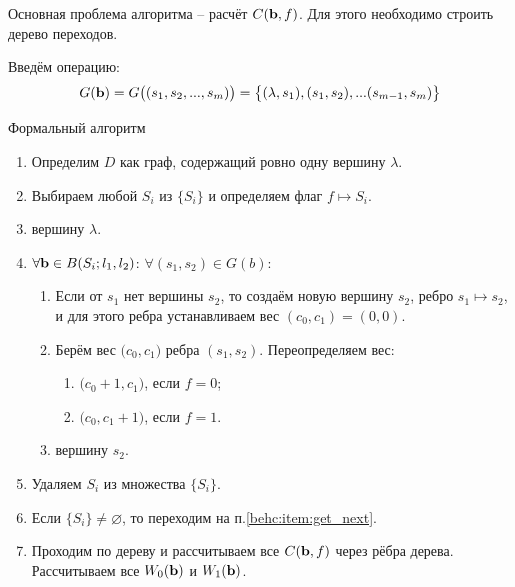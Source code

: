 \begin{frame}
	Основная проблема алгоритма -- расчёт $C(\bold b, f)$. Для этого необходимо строить дерево переходов. 
	
	Введём операцию:
	\begin{equation}
	G(\bold b) = G\big( (s_1, s_2, ..., s_m) \big)
	= \big\{ (\lambda, s_1), (s_1, s_2), ... (s_{m-1}, s_m) \big\}
	\end{equation}
\end{frame}

\begin{frame}{Формальный алгоритм}
	\small
	\begin{enumerate}
		\item Определим $D$ как граф, содержащий ровно одну вершину $\lambda$.
		\item Выбираем любой $S_i$ из $\big\{ S_i\big\}$ и определяем флаг $f \longmapsto S_i$.
			\label{behc:item:get_next}
		\item {} вершину $\lambda$.
		\item $\forall \bold b \in B(S_i; l_1, l_2)$:  
		$\forall (s_1, s_2) \in G(b)$: 
		\begin{enumerate}
			\item Если от  $s_1$ нет
			вершины $s_2$, то создаём новую вершину $s_2$, ребро $s_1 \longmapsto s_2$,
			и для этого ребра устанавливаем вес $(c_0,c_1)=(0,0)$.
			\item Берём вес $\big(c_0, c_1\big)$ ребра $(s_1, s_2)$.
			Переопределяем вес:
			\begin{enumerate}
				\item $\big(c_0 + 1, c_1\big)$, если $f=0$;
				\item $\big(c_0, c_1 +1 \big)$, если $f=1$.
			\end{enumerate}
			\item {} вершину $s_2$.
		\end{enumerate}
		\item Удаляем $S_i$ из множества $\big\{ S_i\big\}$.
		\item Если $\big\{ S_i\big\}\neq \varnothing$, то переходим на п.\ref{behc:item:get_next}.
		\item Проходим по дереву и рассчитываем все $C(\bold b, f)$
		через рёбра дерева. Рассчитываем все $W_0(\bold b)$ и $W_1(\bold b)$.
	\end{enumerate}	
\end{frame}

